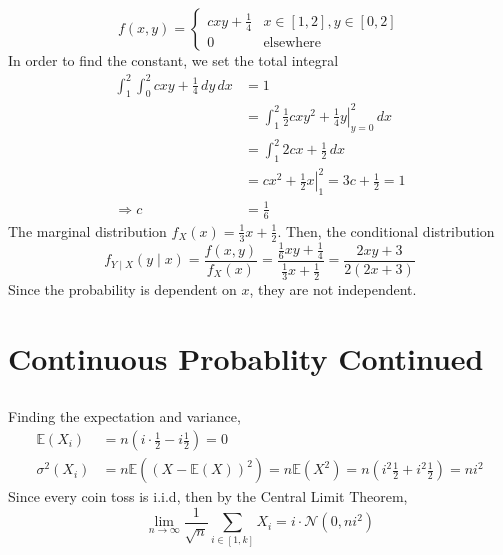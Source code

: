 \documentclass{article}
\newcommand{\E}{\mathbb{E}}
\begin{document}
\subsection{}

\begin{equation}
    f(x, y) =
    \begin{cases}
        c x y + \frac{1}{4} & x \in [1, 2], y \in [0, 2] \\
        0 & \text{elsewhere}
    \end{cases}
\end{equation}
In order to find the constant, we set the total integral
\begin{align}
    \int_1^2 \int_0^2 c x y + \frac{1}{4} \, dy \, dx &= 1 \\
    &= \int_1^2 \left.\frac{1}{2} c x y^2 + \frac{1}{4} y\right|_{y = 0}^2 \, dx \\
    &= \int_1^2 2 c x + \frac{1}{2} \, dx \\
    &= \left.c x^2 + \frac{1}{2} x\right|_1^2 = 3c + \frac{1}{2} = 1 \\
    \Rightarrow c &= \frac{1}{6}
\end{align}
The marginal distribution \(f_X(x) = \frac{1}{3}x + \frac{1}{2}\).
Then, the conditional distribution
\begin{equation}
    f_{Y \mid X}(y \mid x) = \frac{f(x, y)}{f_X(x)} = \frac{\frac{1}{6}xy + \frac{1}{4}}{\frac{1}{3}x + \frac{1}{2}} = \frac{2xy + 3}{2(2x + 3)}
\end{equation}
Since the probability is dependent on \(x\), they are not independent.

\section{Continuous Probablity Continued}

\subsection{}

Finding the expectation and variance,
\begin{align}
    \E(X_i) &= n (i \cdot \frac{1}{2} - i \frac{1}{2}) = 0 \\
    \sigma^2(X_i) &= n\E\left((X - \E(X))^2\right) = n\E(X^2) = n\left(i^2 \frac{1}{2} + i^2 \frac{1}{2}\right) = ni^2
\end{align}
Since every coin toss is i.i.d, then by the Central Limit Theorem,
\begin{equation}
    \lim_{n \to \infty} \frac{1}{\sqrt{n}} \sum_{i \in [1, k]} X_i = i \cdot \mathcal{N}(0, n i^2)
\end{equation}
\end{document}
